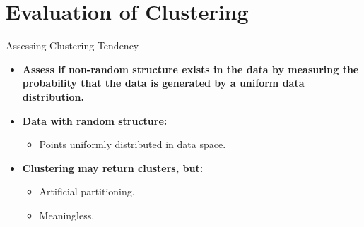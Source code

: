 \section{Evaluation of Clustering}

\begin{frame}{Assessing Clustering Tendency}
	\begin{itemize}
		\item \textbf{Assess {\color{airforceblue}if non-random structure}
			      exists in the data by measuring the probability that the data is
			      generated by a uniform data distribution.}
		\item \textbf{Data with random structure:}
		      \begin{itemize}
			      \item Points uniformly distributed in data space.
		      \end{itemize}
		\item \textbf{Clustering may return clusters, but:}
		      \begin{itemize}
			      \item Artificial partitioning.
			      \item Meaningless.
		      \end{itemize}
	\end{itemize}
\end{frame}

